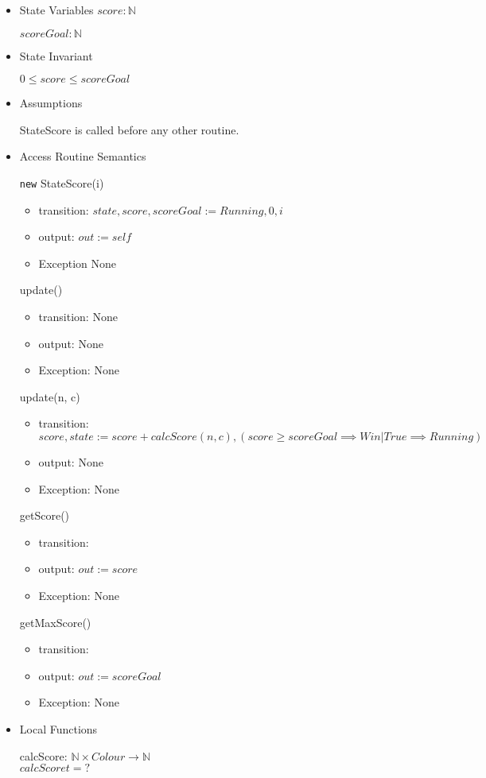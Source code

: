 \documentclass[11pt]{article}
\begin{document}
\begin{itemize}
\item State Variables
\label{sec:org177b780}
\(score: \mathbb{N}\)

\(scoreGoal: \mathbb{N}\)

\item State Invariant
\label{sec:org39bafbb}

\(0 \leq score \leq scoreGoal\)

\item Assumptions
\label{sec:org6b819ef}

StateScore is called before any other routine.

\item Access Routine Semantics
\label{sec:org62c6b6f}

\texttt{new} StateScore(i)
\begin{itemize}
\item transition: \(state, score, scoreGoal := Running, 0, i\)
\item output: \(out := self\)
\item Exception None
\end{itemize}

update()
\begin{itemize}
\item transition: None
\item output: None
\item Exception: None
\end{itemize}

update(n, c)
\begin{itemize}
\item transition: \(score, state := score + calcScore(n, c), (score \geq scoreGoal \implies Win | True \implies Running)\)
\item output: None
\item Exception: None
\end{itemize}

getScore()
\begin{itemize}
\item transition:
\item output: \(out := score\)
\item Exception: None
\end{itemize}

getMaxScore()
\begin{itemize}
\item transition:
\item output: \(out := scoreGoal\)
\item Exception: None
\end{itemize}

\item Local Functions
\label{sec:org84e19bf}

calcScore: \(\mathbb{N} \times Colour \rightarrow \mathbb{N}\) \\
\(calcScore t = ?\)
\end{itemize}
\end{document}
